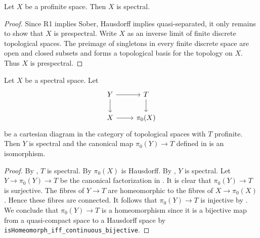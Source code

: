 \begin{lemma}
  \label{thm:profinite-spectral}
  \leanok
  Let $X$ be a profinite space. Then $X$ is spectral.
\end{lemma}

\begin{proof}
  \leanok
  Since R1 implies Sober, Hausdorff implies quasi-separated, it only remains to show that \(X\) is prespectral. Write \(X\) as an inverse limit of finite discrete topological spaces. The preimage of singletons in every finite discrete space are open and closed subsets and forms a topological basis for the topology on \(X\). Thus \(X\) is prespectral.
\end{proof}

\begin{lemma}
\label{thm:cartesian-profinite}
\leanok
Let $X$ be a spectral space. Let
\[
\begin{tikzcd}
Y \arrow[r] \arrow[d] & T \arrow[d] \\
X \arrow[r] & \pi_0(X)
\end{tikzcd}
\]
be a cartesian diagram in the category of topological spaces with $T$ profinite. Then $Y$ is spectral and the canonical map $\pi_0(Y) \to T$ defined in  is an isomorphism.
\end{lemma}

\begin{proof}
  \leanok
  By , \(T\) is spectral. By  \(\pi_0(X)\) is Hausdorff.
  By , \(Y\) is spectral.
  Let $Y \to \pi_0(Y) \to T$ be the canonical factorization in . It is clear that $\pi_0(Y) \to T$ is surjective. The fibres of $Y \to T$ are homeomorphic to the fibres of $X \to \pi_0(X)$. Hence these fibres are connected. It follows that $\pi_0(Y) \to T$ is injective by . We conclude that $\pi_0(Y) \to T$ is a homeomorphism since it is a bijective map from a quasi-compact space to a Hausdorff space by \verb`isHomeomorph_iff_continuous_bijective`.
\end{proof}

